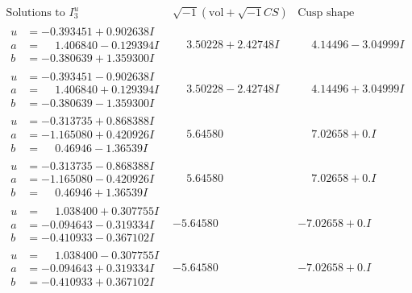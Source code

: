 \documentclass[1p]{elsarticle_modified}
\theoremstyle{definition}
\newcommand{\I}{\sqrt{-1}}
\begin{document}
$$\begin{array}{c|c|c}  
\text{Solutions to }I^u_{3}& \I (\text{vol} + \sqrt{-1}CS) & \text{Cusp shape}\\
 \hline 
\begin{aligned}
u &= -0.393451 + 0.902638 I \\
a &= \phantom{-}1.406840 - 0.129394 I \\
b &= -0.380639 + 1.359300 I\end{aligned}
 & \phantom{-}3.50228 + 2.42748 I & \phantom{-}4.14496 - 3.04999 I \\ \hline\begin{aligned}
u &= -0.393451 - 0.902638 I \\
a &= \phantom{-}1.406840 + 0.129394 I \\
b &= -0.380639 - 1.359300 I\end{aligned}
 & \phantom{-}3.50228 - 2.42748 I & \phantom{-}4.14496 + 3.04999 I \\ \hline\begin{aligned}
u &= -0.313735 + 0.868388 I \\
a &= -1.165080 + 0.420926 I \\
b &= \phantom{-}0.46946 - 1.36539 I\end{aligned}
 & \phantom{-}5.64580\phantom{ +0.000000I} & \phantom{-}7.02658 + 0. I\phantom{ +0.000000I} \\ \hline\begin{aligned}
u &= -0.313735 - 0.868388 I \\
a &= -1.165080 - 0.420926 I \\
b &= \phantom{-}0.46946 + 1.36539 I\end{aligned}
 & \phantom{-}5.64580\phantom{ +0.000000I} & \phantom{-}7.02658 + 0. I\phantom{ +0.000000I} \\ \hline\begin{aligned}
u &= \phantom{-}1.038400 + 0.307755 I \\
a &= -0.094643 - 0.319334 I \\
b &= -0.410933 - 0.367102 I\end{aligned}
 & -5.64580\phantom{ +0.000000I} & -7.02658 + 0. I\phantom{ +0.000000I} \\ \hline\begin{aligned}
u &= \phantom{-}1.038400 - 0.307755 I \\
a &= -0.094643 + 0.319334 I \\
b &= -0.410933 + 0.367102 I\end{aligned}
 & -5.64580\phantom{ +0.000000I} & -7.02658 + 0. I\phantom{ +0.000000I} \\ \hline\begin{aligned}

\end{aligned}
\end{array}$$
\end{document}
